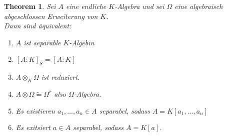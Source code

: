 \documentclass[10pt,a4paper]{article}
\newcommand{\isomorph}{\ensuremath{\tilde{=}}}
\newcounter{thm}[section]
\theoremstyle{definition}
\theoremstyle{plain}
\newtheorem{theorem}[thm]{Theorem}
\theoremstyle{remark}
\begin{document}
\begin{theorem}\label{926thm}
	Sei $A$ eine endliche $K$-Algebra und sei $\Omega$ eine algebraisch abgeschlossen Erweiterung von $K$.\\
	Dann sind äquivalent:
	\begin{enumerate}
		\item $A$ ist separable $K$-Algebra
		\item $[A:K]_S=[A:K]$
		\item $A\otimes_K\Omega$ ist reduziert.
		\item $A\otimes\Omega\isomorph \Omega^r$ also $\Omega$-Algebra.
		\item Es existieren $a_1,...,a_n\in A$ separabel, sodass $A=K[a_1,...,a_n]$
		\item Es exitsiert $a\in A$ separabel, sodass $A=K[a]$.
	\end{enumerate}
\end{theorem}
\end{document}
